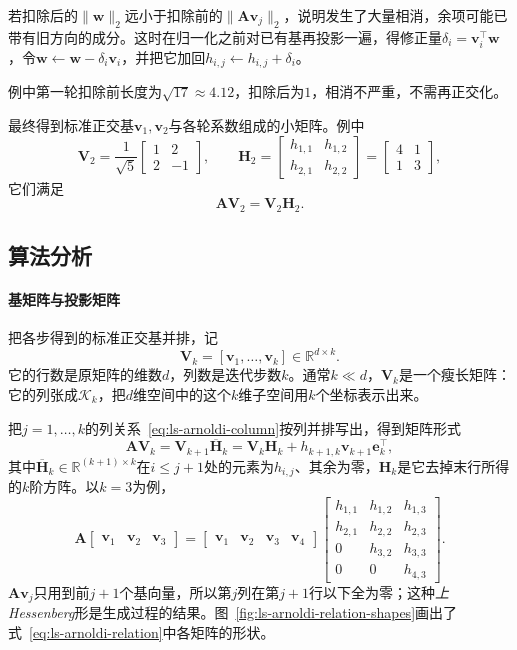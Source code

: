 若扣除后的$\lVert\bm w\rVert_2$远小于扣除前的$\lVert\bm A\bm v_j\rVert_2$，说明发生了大量相消，余项可能已带有旧方向的成分。这时在归一化之前对已有基再投影一遍，得修正量$\delta_i=\bm v_i^\top\bm w$，令$\bm w\leftarrow\bm w-\delta_i\bm v_i$，并把它加回$h_{i,j}\leftarrow h_{i,j}+\delta_i$。

例中第一轮扣除前长度为$\sqrt{17}\approx4.12$，扣除后为$1$，相消不严重，不需再正交化。

最终得到标准正交基$\bm v_1,\bm v_2$与各轮系数组成的小矩阵。例中
\[
 \bm V_2=\frac1{\sqrt5}\begin{bmatrix}1&2\\2&-1\end{bmatrix},\qquad
 \bm H_2=\begin{bmatrix}h_{1,1}&h_{1,2}\\h_{2,1}&h_{2,2}\end{bmatrix}=\begin{bmatrix}4&1\\1&3\end{bmatrix},
\]
它们满足
\[
 \bm A\bm V_2=\bm V_2\bm H_2 .
\]

\subsection{算法分析}

\paragraph{基矩阵与投影矩阵}
把各步得到的标准正交基并排，记
\begin{equation}
 \bm V_k=[\bm v_1,\ldots,\bm v_k]\in\mathbb R^{d\times k}.
 \label{eq:ls-arnoldi-basis-matrix}
\end{equation}
它的行数是原矩阵的维数$d$，列数是迭代步数$k$。通常$k\ll d$，$\bm V_k$是一个瘦长矩阵：它的列张成$\mathcal K_k$，把$d$维空间中的这个$k$维子空间用$k$个坐标表示出来。

把$j=1,\ldots,k$的列关系~\eqref{eq:ls-arnoldi-column}按列并排写出，得到矩阵形式
\begin{equation}
 \bm A\bm V_k=\bm V_{k+1}\overline{\bm H}_k=\bm V_k\bm H_k+h_{k+1,k}\bm v_{k+1}\bm e_k^\top ,
 \label{eq:ls-arnoldi-relation}
\end{equation}
其中$\overline{\bm H}_k\in\mathbb R^{(k+1)\times k}$在$i\le j+1$处的元素为$h_{i,j}$、其余为零，$\bm H_k$是它去掉末行所得的$k$阶方阵。以$k=3$为例，
\[
 \bm A\begin{bmatrix}\bm v_1&\bm v_2&\bm v_3\end{bmatrix}
 =\begin{bmatrix}\bm v_1&\bm v_2&\bm v_3&\bm v_4\end{bmatrix}
 \begin{bmatrix}h_{1,1}&h_{1,2}&h_{1,3}\\h_{2,1}&h_{2,2}&h_{2,3}\\0&h_{3,2}&h_{3,3}\\0&0&h_{4,3}\end{bmatrix}.
\]
$\bm A\bm v_j$只用到前$j+1$个基向量，所以第$j$列在第$j+1$行以下全为零；这种\emph{上Hessenberg}形是生成过程的结果。图~\ref{fig:ls-arnoldi-relation-shapes}画出了式~\eqref{eq:ls-arnoldi-relation}中各矩阵的形状。

